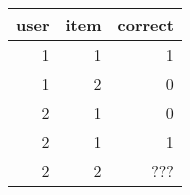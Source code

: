 \begin{tabular}{rrr}
\toprule
 user &  item &  correct \\
\midrule
    1 &     1 &        1 \\
    1 &     2 &        0 \\
    2 &     1 &        0 \\
    2 &     1 &        1 \\
    2 &     2 &        ??? \\
\bottomrule
\end{tabular}
